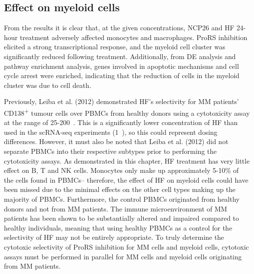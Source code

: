 \subsection{Effect on myeloid cells}
From the results it is clear that, at the given concentrations,  NCP26 and HF 24-hour treatment adversely affected monocytes and macrophages.
ProRS inhibition elicited a strong transcriptional response, and the myeloid cell cluster was significantly reduced following treatment.
Additionally, from DE analysis and pathway enrichment analysis, genes involved in apoptotic mechanisms and cell cycle arrest were enriched, indicating that the reduction of cells in the myeloid cluster was due to cell death.

Previously, Leiba et al. (2012) demonstrated HF's selectivity for MM patients' CD138\textsuperscript{+} tumour cells over PBMCs from healthy donors\cite{leiba2012halofuginone} using a cytotoxicity assay at the range of 25-200\si{\nano\Molar}.
This is a significantly lower concentration of HF than used in the scRNA-seq experiments (1\si{\micro\Molar}), so this could represent dosing differences.
However, it must also be noted that Leiba et al. (2012) did not separate PBMCs into their respective subtypes prior to performing the cytotoxicity assays.
As demonstrated in this chapter, HF treatment has very little effect on B, T and NK cells.
Monocytes only make up approximately 5-10\% of the cells found in PBMCs-- therefore, the effect of HF on myeloid cells could have been missed due to the minimal effects on the other cell types making up the majority of PBMCs.
Furthermore, the control PBMCs originated from healthy donors and not from MM patients.
The immune microenvironment of MM patients has been shown to be substantially altered and impaired compared to healthy individuals\cite{de2013analysis}, meaning that using healthy PBMCs as a control for the selectivity of HF may not be entirely appropriate.
To truly determine the cytotoxic selectivity of ProRS inhibition for MM cells and myeloid cells, cytotoxic assays must be performed in parallel for MM cells and myeloid cells originating from MM patients.

